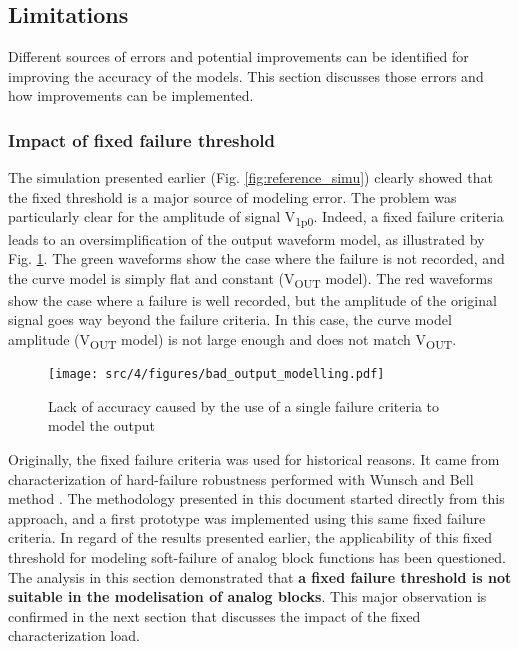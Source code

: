 \subsection{Limitations}
\label{sec:current-limitations}

Different sources of errors and potential improvements can be identified for improving the accuracy of the models.
This section discusses those errors and how improvements can be implemented.

\subsubsection{Impact of fixed failure threshold}
\label{sec:fixed-failure-threshold}

The simulation presented earlier (Fig. \ref{fig:reference_simu}) clearly showed that the fixed threshold is a major source of modeling error.
The problem was particularly clear for the amplitude of signal V\textsubscript{1p0}.
Indeed, a fixed failure criteria leads to an oversimplification of the output waveform model, as illustrated by Fig. \ref{fig:impact-single-failure-criteria}.
The green waveforms show the case where the failure is not recorded, and the curve model is simply flat and constant (V\textsubscript{OUT} model).
The red waveforms show the case where a failure is well recorded, but the amplitude of the original signal goes way beyond the failure criteria.
In this case, the curve model amplitude (V\textsubscript{OUT} model) is not large enough and does not match V\textsubscript{OUT}.

\begin{figure}[!h]
  \centering
  \texttt{[image: src/4/figures/bad\_output\_modelling.pdf]}
  \caption{Lack of accuracy caused by the use of a single failure criteria to model the output}
  \label{fig:impact-single-failure-criteria}
\end{figure}

%
Originally, the fixed failure criteria was used for historical reasons.
It came from characterization of hard-failure robustness performed with Wunsch and Bell method \cite{wunsch-bell}.
The methodology presented in this document started directly from this approach, and a first prototype was implemented using this same fixed failure criteria.
In regard of the results presented earlier, the applicability of this fixed threshold for modeling soft-failure of analog block functions has been questioned.
The analysis in this section demonstrated that \textbf{a fixed failure threshold is not suitable in the modelisation of analog blocks}.
This major observation is confirmed in the next section that discusses the impact of the fixed characterization load.

